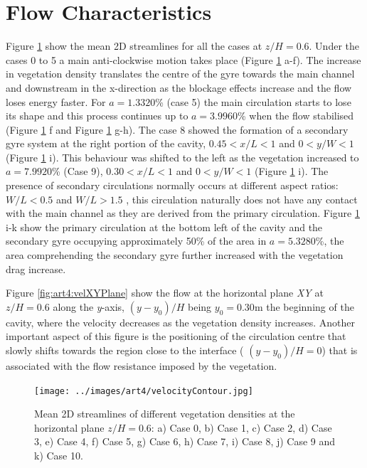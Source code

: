 \section{Flow Characteristics}
Figure \ref{fig:art4:velocityContour} show the mean 2D streamlines for all the cases at $z/H=0.6$. Under the cases 0 to 5 a main anti-clockwise motion takes place (Figure \ref{fig:art4:velocityContour}  a-f). The increase in vegetation density translates the centre of the gyre towards the main channel and downstream in the x-direction as the blockage effects increase and the flow loses energy faster. For $a=1.3320$\% (case 5) the main circulation starts to lose its shape and this process continues up to $a=3.9960$\% when the flow stabilised (Figure \ref{fig:art4:velocityContour}  f and Figure \ref{fig:art4:velocityContour}  g-h). The case 8 showed the formation of a secondary gyre system at the right portion of the cavity, $0.45<x/L<1$ and $0<y/W<1$ (Figure \ref{fig:art4:velocityContour}  i). This behaviour was shifted to the left as the vegetation increased to $a=7.9920$\% (Case 9), $0.30<x/L<1$ and $0<y/W<1$ (Figure \ref{fig:art4:velocityContour}  i). The presence of secondary circulations normally occurs at different aspect ratios: $W/L<0.5$ and $W/L>1.5$ \cite{Sukhodolov2002}, this circulation naturally does not have any contact with the main channel as they are derived from the primary circulation. Figure \ref{fig:art4:velocityContour}  i-k show the primary circulation at the bottom left of the cavity and the secondary gyre occupying approximately 50\% of the area in $a=5.3280$\%, the area comprehending the secondary gyre further increased with the vegetation drag increase.

Figure \ref{fig:art4:velXYPlane} show the flow at the horizontal plane \textit{XY} at $z/H = 0.6$ along the \textit{y}-axis, $(y-y_0)/H$ being $y_0=0.30$m the beginning of the cavity, where the velocity decreases as the vegetation density increases. Another important aspect of this figure is the positioning of the circulation centre that slowly shifts towards the region close to the interface ( $(y-y_0)/H=0$) that is associated with the flow resistance imposed by the vegetation.

\begin{figure}[!ht]
\centering
\texttt{[image: ../images/art4/velocityContour.jpg]}
\caption{Mean 2D streamlines of different vegetation densities at the horizontal plane $z/H = 0.6$: a) Case 0, b) Case 1, c) Case 2, d) Case 3, e) Case 4, f) Case 5, g) Case 6, h) Case 7, i) Case 8, j) Case 9 and k) Case 10.}
\label{fig:art4:velocityContour}
\end{figure}

